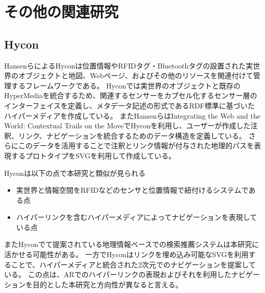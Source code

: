 \section {その他の関連研究}

\subsection{Hycon}
HansenらによるHycon\cite{10.1080/13614560410001725310}は位置情報やRFIDタグ・Bluetoothタグの設置された実世界のオブジェクトと地図、Webページ、およびその他のリソースを関連付けて管理するフレームワークである。
Hyconでは実世界のオブジェクトと既存のHyperMediaを統合するため、関連するセンサーをカプセル化するセンサー層のインターフェイスを定義し、メタデータ記述の形式であるRDF標準に基づいたハイパーメディアを作成している。
またHansenらはIntegrating the Web and the World: Contextual Trails on the Move\cite{10.1145/1012807.1012837}でHyconを利用し、ユーザーが作成した注釈、リンク、ナビゲーションを統合するためのデータ構造を定義している。
さらにこのデータを活用することで注釈とリンク情報が付与された地理的パスを表現するプロトタイプをSVGを利用して作成している。

Hyconは以下の点で本研究と類似が見られる
\begin{itemize}
  \item 実世界と情報空間をRFIDなどのセンサと位置情報で紐付けるシステムである点
  \item ハイパーリンクを含むハイパーメディアによってナビゲーションを表現している点
\end{itemize}
またHyconでて提案されている地理情報ベースでの検索推薦システムは本研究に活かせる可能性がある。
一方でHyconはリンクを埋め込み可能なSVGを利用することで、ハイパーメディアと統合された2次元でのナビゲーションを提案している。
この点は、ARでのハイパーリンクの表現およびそれを利用したナビゲーションを目的とした本研究と方向性が異なると言える。



